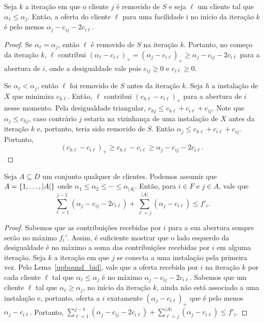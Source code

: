 \begin{lemma}
    \label{upbound_bid}
    Seja $k$ a iteração em que o cliente $j$ é removido de $S$ e seja $\ell$ um cliente tal que $\alpha_\ell \leq \alpha_j$. Então, a oferta do cliente $\ell$ para uma facilidade i no início da iteração $k$ é pelo menos $\alpha_j - c_{ij} - 2c_{i\ell}$.
\end{lemma}

\begin{proof}
Se $\alpha_\ell = \alpha_j$, então $\ell$ é removido de $S$ na iteração $k$. Portanto, no começo da iteração $k$, $\ell$ contribui $(\alpha_\ell - c_{i\ell})_+ = (\alpha_j - c_{i\ell})_+ \geq \alpha_j - c_{ij} - 2c_{i\ell}$ para a abertura de $i$, onde a desigualdade vale pois $c_{ij}\geq 0$ e $c_{i\ell} \geq 0$.

Se $\alpha_\ell < \alpha_j $, então $\ell$ foi removido de $S$ antes da iteração $k$.
Seja $h$ a instalação de $X$ que minimiza $c_{h\ell}$.
Então, $\ell$ contribui $(c_{h\ell} - c_{i\ell})_+$ para a abertura de $i$ nesse momento. 
Pela desigualdade triangular, $c_{hj} \leq c_{h\ell} + c_{i\ell} + c_{ij}$. 
Note que $\alpha_j \leq c_{hj}$, caso contrário $j$ estaria na vizinhança de uma instalação de $X$ antes da iteração $k$ e, portanto, teria sido removido de $S$. Então $\alpha_j \leq c_{h\ell} + c_{i\ell } + c_{ij}$. 
Portanto,
\begin{equation}
    (c_{h\ell} - c_{i\ell})_+ \geq c_{h\ell} - c_{i\ell} \geq \alpha_j - c_{ij} - 2c_{i\ell}. \nonumber
\end{equation}
\end{proof}


\begin{lemma}
\label{lowerbound_fcost}
Seja $A \subseteq D$ um conjunto qualquer de clientes. Podemos assumir que $A = \{1,\ldots,|A|\}$ onde $\alpha_1 \leq \alpha_2 \leq \cdots \leq \alpha_{|A|}$. Então, para $i \in F$ e $j \in A$, vale que
\[ \sum_{\ell=1}^{j-1}(\alpha_j - c_{ij} - 2c_{i\ell}) + \sum_{\ell= j}^{|A|}(\alpha_j - c_{i\ell}) \leq f'_i.
\]
\end{lemma}
\begin{proof}
Sabemos que as contribuições recebidas por $i$ para a sua abertura sempre serão no máximo $f_i'$. Assim, é suficiente mostrar que o lado esquerdo da desigualdade é no máximo a soma das contribuições recebidas por $i$ em alguma iteração. Seja $k$ a iteração em que $j$ se conecta a uma instalação pela primeira vez. Pelo Lema~\ref{upbound_bid}, vale que a oferta recebida por $i$ na iteração $k$ por cada cliente $\ell$ tal que $\alpha_\ell \leq \alpha_j$ é no máximo $\alpha_j - c_{ij} - 2c_{i\ell}$. Sabemos que um cliente $\ell$ tal que $\alpha_\ell \geq \alpha_j$, no início da iteração $k$, ainda não está associado a uma instalação e, 
portanto, oferta a $i$ exatamente $(\alpha_j - c_{i\ell})_+$  que é pelo menos $\alpha_j - c_{i\ell}$. Portanto, $\sum_{\ell=1}^{j-1}(\alpha_j - c_{ij} - 2c_{i\ell}) + \sum_{\ell= j}^{|A|}(\alpha_j - c_{i\ell}) \leq f'_i$.
\end{proof}


